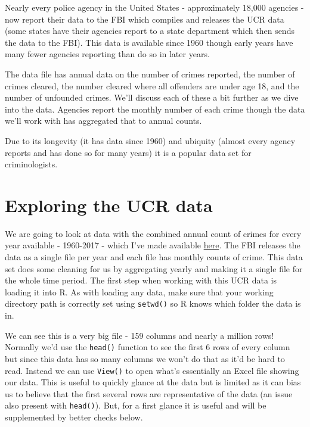 \documentclass[
  12pt,
  openany]{book}
\begin{document}
Nearly every police agency in the United States - approximately 18,000 agencies - now report their data to the FBI which compiles and releases the UCR data (some states have their agencies report to a state department which then sends the data to the FBI). This data is available since 1960 though early years have many fewer agencies reporting than do so in later years.

The data file has annual data on the number of crimes reported, the number of crimes cleared, the number cleared where all offenders are under age 18, and the number of unfounded crimes. We'll discuss each of these a bit further as we dive into the data. Agencies report the monthly number of each crime though the data we'll work with has aggregated that to annual counts.

Due to its longevity (it has data since 1960) and ubiquity (almost every agency reports and has done so for many years) it is a popular data set for criminologists.

\hypertarget{exploring-the-ucr-data}{%
\section{Exploring the UCR data}\label{exploring-the-ucr-data}}

We are going to look at data with the combined annual count of crimes for every year available - 1960-2017 - which I've made available \href{http://doi.org/10.3886/E100707V11}{here}. The FBI releases the data as a single file per year and each file has monthly counts of crime. This data set does some cleaning for us by aggregating yearly and making it a single file for the whole time period. The first step when working with this UCR data is loading it into R. As with loading any data, make sure that your working directory path is correctly set using \texttt{setwd()} so R knows which folder the data is in.

We can see this is a very big file - 159 columns and nearly a million rows! Normally we'd use the \texttt{head()} function to see the first 6 rows of every column but since this data has so many columns we won't do that as it'd be hard to read. Instead we can use \texttt{View()} to open what's essentially an Excel file showing our data. This is useful to quickly glance at the data but is limited as it can bias us to believe that the first several rows are representative of the data (an issue also present with \texttt{head()}). But, for a first glance it is useful and will be supplemented by better checks below.
\end{document}
